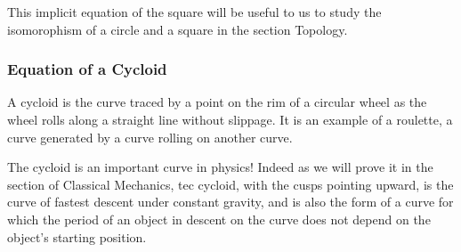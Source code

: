 	This implicit equation of the square will be useful to us to study the isomorophism of a circle and a square in the section Topology.
	
	\subsubsection{Equation of a Cycloid}
	A cycloid is the curve traced by a point on the rim of a circular wheel as the wheel rolls along a straight line without slippage. It is an example of a roulette, a curve generated by a curve rolling on another curve.

	The cycloid is an important curve in physics! Indeed as we will prove it in the section of Classical Mechanics, tec cycloid, with the cusps pointing upward, is the curve of fastest descent under constant gravity, and is also the form of a curve for which the period of an object in descent on the curve does not depend on the object's starting position.

